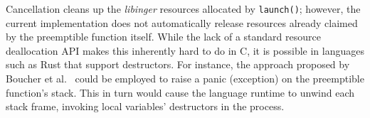 Cancellation cleans up the \textit{libinger} resources allocated by
\texttt{launch()};
however, the current implementation
does not automatically release resources already claimed by the
preemptible function itself.  While the lack of a standard resource deallocation API
makes this inherently hard to do in C, it is possible in languages
such as Rust that support destructors.  For instance, the approach proposed by
Boucher et al.~\cite{boucher:atc2018} could be employed to raise a panic
(exception) on the preemptible function's stack.  This in turn would cause the
language runtime
to unwind each stack frame, invoking local variables' destructors in
the process.

